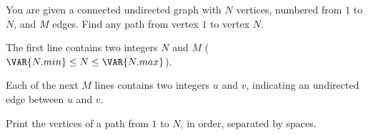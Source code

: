 You are given a connected undirected graph with $N$ vertices, numbered from $1$
to $N$, and $M$ edges. Find any path from vertex $1$ to vertex $N$.

The first line contains two integers $N$ and $M$
($\VAR{N.min} \le N \le \VAR{N.max}$).

Each of the next $M$ lines contains two integers $u$ and $v$, indicating an
undirected edge between $u$ and $v$.

Print the vertices of a path from $1$ to $N$, in order, separated by spaces.
